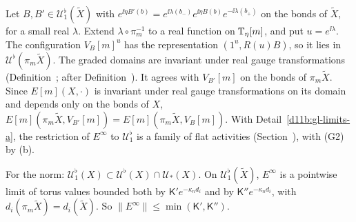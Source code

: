 \begin{step}
Let $B,B'\in\mathcal U^\flat_1(\tilde X)$ with $e^{\ii\eta B'(b)}=e^{\ii\lambda(b_-)}e^{\ii\eta B(b)}e^{-\ii\lambda(b_+)}$ on the bonds of $\tilde X$, for a small real $\lambda$. Extend $\lambda\circ\pi_m^{-1}$ to a real function on $\mathbb T_\eta[m]$, and put $u=e^{\ii\lambda}$. The configuration $V_B[m]^u$ has the representation $(1^u,R(u)B)$, so it lies in $\mathcal U^\flat(\pi_m\tilde X)$. The graded domains are invariant under real gauge transformations (Definition~; after Definition~). It agrees with $V_{B'}[m]$ on the bonds of $\pi_m\tilde X$. Since $E[m](X,\cdot)$ is invariant under real gauge transformations on its domain and depends only on the bonds of $X$, $E[m](\pi_m\tilde X,V_{B'}[m])=E[m](\pi_m\tilde X,V_B[m])$. With Detail~\ref{d11b:gl-limits-a}, the restriction of $E^\infty$ to $\mathcal U^\flat_1$ is a family of flat activities (Section~), with (G2) by (b).

For the norm: $\mathcal U^\flat_1(X)\subset\mathcal U^\flat(X)\cap\mathcal U_*(X)$. On $\mathcal U^\flat_1(\tilde X)$, $E^\infty$ is a pointwise limit of torus values bounded both by $\mathsf K'e^{-\kappa_nd_i}$ and by $\mathsf K''e^{-\kappa_nd_i}$, with $d_i(\pi_m\tilde X)=d_i(\tilde X)$. So $\|E^\infty\|\le\min(\mathsf K',\mathsf K'')$.
\end{step}

